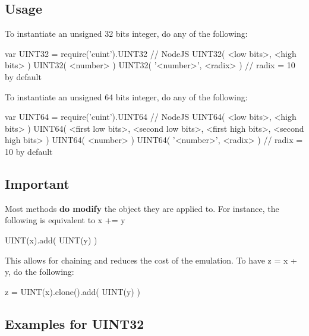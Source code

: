 \subsection*{Usage}

To instantiate an unsigned 32 bits integer, do any of the following\+: \begin{DoxyVerb}var UINT32 = require('cuint').UINT32 // NodeJS
UINT32( <low bits>, <high bits> )
UINT32( <number> )
UINT32( '<number>', <radix> ) // radix = 10 by default
\end{DoxyVerb}


To instantiate an unsigned 64 bits integer, do any of the following\+: \begin{DoxyVerb}var UINT64 = require('cuint').UINT64 // NodeJS
UINT64( <low bits>, <high bits> )
UINT64( <first low bits>, <second low bits>, <first high bits>, <second high bits> )
UINT64( <number> )
UINT64( '<number>', <radix> ) // radix = 10 by default
\end{DoxyVerb}


\subsection*{Important}

Most methods {\bfseries do modify} the object they are applied to. For instance, the following is equivalent to {\ttfamily x += y} \begin{DoxyVerb}UINT(x).add( UINT(y) )
\end{DoxyVerb}


This allows for chaining and reduces the cost of the emulation. To have {\ttfamily z = x + y}, do the following\+: \begin{DoxyVerb}z = UINT(x).clone().add( UINT(y) )
\end{DoxyVerb}


\subsection*{Examples for U\+I\+N\+T32}


